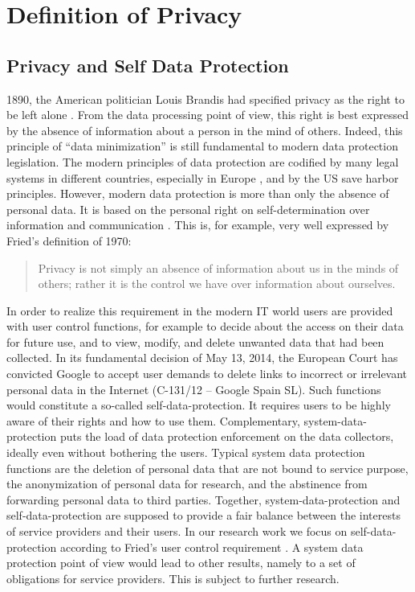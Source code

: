 \documentclass[runningheads,a4paper]{llncs}
\begin{document}
\section{Definition of Privacy}
\label{sec:privacydef}


\subsection{Privacy and Self Data Protection}
1890, the American politician Louis Brandis had specified privacy as the right to be left alone \cite{WarrenBrandeis:RightToPrivacy}. From the data processing point of view, this right is best expressed by the absence of information about a person in the mind of others. Indeed, this principle of “data minimization” is still fundamental to modern data protection legislation. The modern principles of data protection are codified by many legal systems in different countries, especially in Europe \cite{EU-directive2}, and by the US save harbor principles. However, modern data protection is more than only the absence of personal data. It is based on the personal right on self-determination over information and communication \cite{BVerfG:census}. This is, for example, very well expressed by Fried’s definition of 1970:
\begin{quote}
	Privacy is not simply an absence of information about us in the minds of others; rather it is the control we have over information about ourselves. \cite{CFried:Privacy}
\end{quote}
In order to realize this requirement in the modern IT world users are provided with user control functions, for example to decide about the access on their data for future use, and to view, modify, and delete unwanted data that had been collected. In its fundamental decision of May 13, 2014, the European Court has convicted Google to accept user demands to delete links to incorrect or irrelevant personal data in the Internet (C-131/12 – Google Spain SL). Such functions would constitute a so-called self-data-protection. It requires users to be highly aware of their rights and how to use them. Complementary, system-data-protection puts the load of data protection enforcement on the data collectors, ideally even without bothering the users. Typical system data protection functions are the deletion of personal data that are not bound to service purpose, the anonymization of personal data for research, and the abstinence from forwarding personal data to third parties. Together, system-data-protection and self-data-protection are supposed to provide a fair balance between the interests of service providers and their users.
In our research work we focus on self-data-protection according to Fried’s user control requirement \cite{CFried:Privacy}. A system data protection point of view would lead to other results, namely to a set of obligations for service providers. This is subject to further research.
\end{document}
